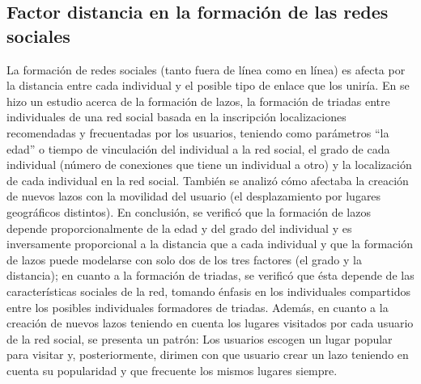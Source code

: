 \subsection{Factor distancia en la formación de las redes sociales}

La formación de redes sociales (tanto fuera de línea como en línea) es afecta por la distancia entre cada individual y el posible tipo de enlace que los uniría. En \cite{evolution} se hizo un estudio acerca de la formación de lazos, la formación de triadas entre individuales de una red social basada en la inscripción localizaciones recomendadas y frecuentadas por los usuarios, teniendo como parámetros ``la edad'' o tiempo de vinculación del individual a la red social, el grado de cada individual (número de conexiones que tiene un individual a otro) y la localización de cada individual en la red social. También se analizó cómo afectaba la creación de nuevos lazos con la movilidad del usuario (el desplazamiento por lugares geográficos distintos). En conclusión, se verificó que la formación de lazos depende proporcionalmente de la edad y del grado del individual y es inversamente proporcional a la distancia que a cada individual y que la formación de lazos puede modelarse con solo dos de los tres factores (el grado y la distancia); en cuanto a la formación de triadas, se verificó que ésta depende de las características sociales de la red, tomando énfasis en los individuales compartidos entre los posibles individuales formadores de triadas. Además, en cuanto a la creación de nuevos lazos teniendo en cuenta los lugares visitados por cada usuario de la red social, se presenta un patrón: Los usuarios escogen un lugar popular para visitar y, posteriormente, dirimen con que usuario crear un lazo teniendo en cuenta su popularidad y que frecuente los mismos lugares siempre.

